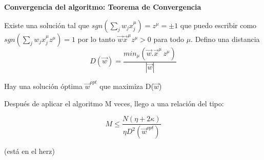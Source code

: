 {\bf Convergencia del algoritmo: Teorema de Convergencia}

Existe una solución tal que $sgn(\sum_j w_jx_j^\mu)=z^{\mu}= \pm 1$ que puedo escribir como $sgn(\sum_j w_jx_j^\mu z^\mu)=1$ por lo tanto $\vec w \vec x^\mu z^\mu > 0$ para todo $\mu$. Defino una distancia 
\begin{equation}
	D(\vec w) = \frac{min_\mu(\vec w . \vec x^\mu \, z^\mu)}{|\vec w|}
\end{equation}

Hay una solución óptima $\vec w ^{opt}$ que maximiza D($\vec w$)

Después de aplicar el algoritmo M veces, llego a una relación del tipo:

\begin{equation}
	M \le \frac{N(\eta + 2\kappa)}{\eta D^2(\vec w ^{opt})}
\end{equation}

(está en el herz)

